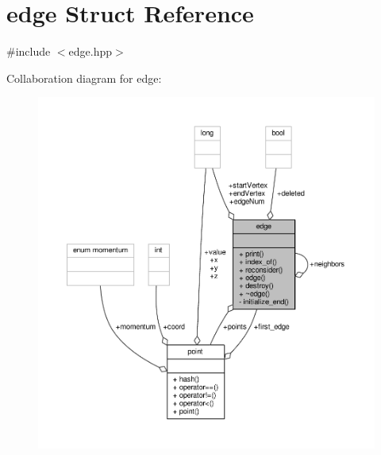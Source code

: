 \hypertarget{classedge}{\section{edge Struct Reference}
\label{classedge}
}


{\ttfamily \#include $<$edge.\-hpp$>$}



Collaboration diagram for edge\-:
\nopagebreak
\begin{figure}[H]
\begin{center}
\leavevmode
\includegraphics[width=350pt]{classedge__coll__graph}
\end{center}
\end{figure}

